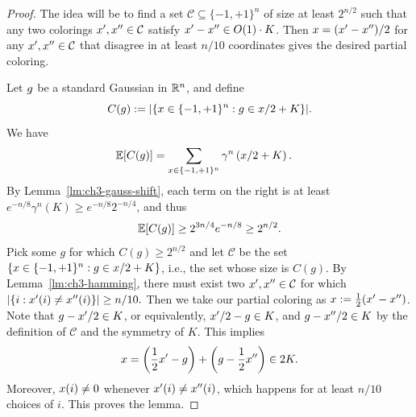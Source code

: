 \begin{proof}
 The idea will be to find a set \(\mathcal{C} \subseteq \{-1,+1\}^n\) of size at
  least \(2^{n/2}\) such that any two colorings
  \(x',x'' \in \mathcal{C}\) satisfy
  \(x'-x'' \in O(1)\cdot K\). Then $x = (x'-x'')/2$ for any \(x',x''
  \in \mathcal{C}\) that
  disagree in at least \(n/10\) coordinates gives the desired partial coloring.

  Let \(g\) be a standard Gaussian in \(\mathbb{R}^n\), and define
  \[
  C(g) := |\{x \in \{-1,+1\}^n: g \in   x/2 +K\}|.
  \]
  We have
  \begin{align*}
    \mathbb{E}[C(g)] &= \sum_{x \in \{-1,+1\}^n} \gamma^n\left(x/2 + K\right).
  \end{align*}
  By Lemma~\ref{lm:ch3-gauss-shift}, each term on the right
  is at least \(e^{-n/8}\gamma^n(K) \ge e^{-n/8}2^{-n/4}\), and thus
  \[
    \mathbb{E}[C(g)] \ge 2^{3n/4}e^{-n/8} \ge 2^{n/2}.\]
Pick some $g$ for which 
  \(C(g) \ge 2^{n/2}\) and let $\mathcal{C}$ be the set $\{x \in \{-1,+1\}^n: g \in   x/2 +K\}$, i.e., the set whose size is $C(g)$. By Lemma~\ref{lm:ch3-hamming},
  there must exist two \(x',x'' \in \mathcal{C}\) for which
  \(
  |\{i: x'(i) \neq x''(i)\}| \ge n/10.
  \)
  Then we take our partial coloring as \(x := \frac12(x' -
  x'')\). Note that $g - x'/2 \in K$, or equivalently, $ x'/2 - g \in K$, and $g -  x''/2
  \in K$ by the definition of
  $\mathcal{C}$ and the symmetry of $K$. This
  implies
  \[
    x = \left(\frac12 x'  - g\right) + \left(g - \frac12 x''\right) \in 2K.
  \]
  Moreover, \(x(i) \neq 0\) whenever \(x'(i) \neq x''(i)\),
  which happens for at least \(n/10\) choices of \(i\). This
  proves the lemma.
\end{proof}

